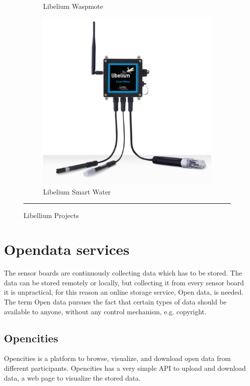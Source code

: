 \documentclass[12pt, a4paper,twoside]{tesi_upf}
\begin{document}
\begin{figure}
\begin{subfigure}[b]{0.3\textwidth}
                \caption{Libelium Waspmote}
                \label{fig:LibeliumWaspmote}
        \end{subfigure}
        \begin{subfigure}[b]{0.3\textwidth}
                \includegraphics[width=\textwidth]{./Figures/LibeliumSmartWater.png}
                \caption{Libelium Smart Water}
                \label{fig:LibeliumSmartWater}
        \end{subfigure}
        \rule{18em}{0.5pt}
        \caption{Libellium Projects}\label{fig:LibelliumProjects}
		\end{figure}

  \section{Opendata services}
    The sensor boards are continuously collecting data which has to be stored. The data can be stored remotely or locally, but collecting it from every sensor board it is unpractical, for this reason an online storage service, Open data, is needed. The term Open data pursues the fact that certain types of data should be available to anyone, without any control mechanism, e.g. copyright.
    
		\subsection{Opencities}
       Opencities \cite{opencities} is a platform to browse, visualize, and download open data from different participants. Opencities has a very simple API to upload and download data, a web page to visualize the stored data.
       
\end{document}
